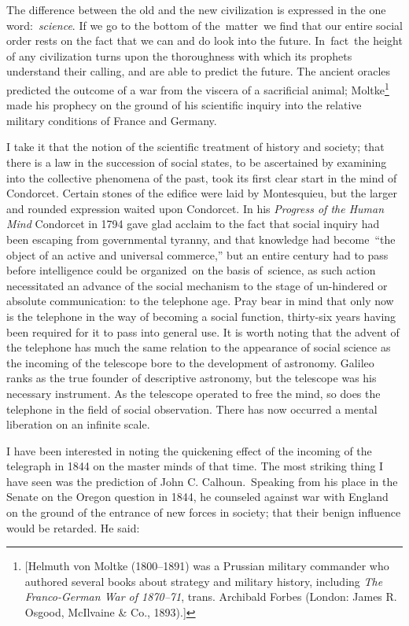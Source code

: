 \documentclass[openany,nobib]{tufte-book}
\begin{document}
The difference between the old and the new civilization is expressed in
the one word:~\emph{science}. If we go to the bottom of the~matter~we
find that our entire social order rests on the fact that we can and do
look into the future. In~fact~the height of any civilization turns upon
the thoroughness with which its prophets understand their calling, and
are able to predict the future. The ancient oracles predicted the
outcome of a war from the viscera of a sacrificial animal;
Moltke\footnote{{[}Helmuth von Moltke (1800--1891) was a Prussian
  military commander who authored several books about strategy and
  military history, including \emph{The Franco-German War of 1870--71},
  trans. Archibald Forbes \emph{} (London: James R. Osgood, McIlvaine \&
  Co., 1893).{]}} made his prophecy on the ground of his scientific
inquiry into the relative military conditions of France and Germany.~

I take it that the notion of the scientific treatment of history and
society; that there is a law in the succession of social states, to be
ascertained by examining into the collective phenomena of the past, took
its first clear start in the mind of Condorcet. Certain stones of the
edifice were laid by Montesquieu, but the larger and rounded expression
waited upon Condorcet. In his \emph{Progress of the Human Mind}
Condorcet in 1794 gave glad acclaim to the fact that social inquiry had
been escaping from governmental tyranny, and that knowledge had
become~``the object of an active and universal commerce,'' but an entire
century had to pass before intelligence could be organized~on the basis
of~science, as such action necessitated an advance of the social
mechanism to the stage of un-hindered or absolute communication: to the
telephone age. Pray bear in mind that only now is the telephone in the
way of becoming a social function, thirty-six years having been required
for it to pass into general use. It is worth noting that the advent of
the telephone has much the same relation to the appearance of social
science as the incoming of the telescope bore to the development of
astronomy. Galileo ranks as the true founder of descriptive astronomy,
but the telescope was his necessary instrument. As the telescope
operated to free the mind, so does the telephone in the field of social
observation. There has now occurred a mental liberation on an infinite
scale.~

I have been interested in noting the quickening effect of the incoming
of the telegraph in 1844 on the master minds of that time. The most
striking thing I have seen was the prediction of John C.
Calhoun.~Speaking from his place in the Senate on the Oregon question in
1844, he counseled against war with England on the ground of the
entrance of new forces in society; that their benign influence would be
retarded. He said:~
\end{document}
